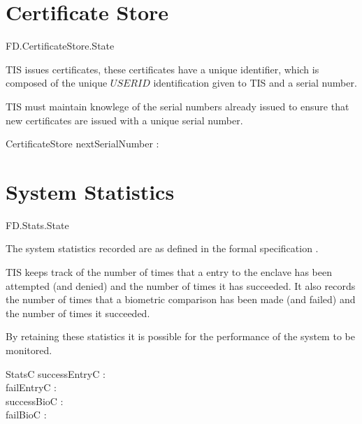 \section{Certificate Store}

\begin{traceunit}{FD.CertificateStore.State}

\end{traceunit}

TIS issues certificates, these certificates have a unique identifier,
which is composed of the unique $USERID$ identification given to TIS
and a serial number.

TIS must maintain knowlege of the serial numbers already issued to
ensure that new certificates are issued with a unique serial number.

\begin{schema}{CertificateStore}
        nextSerialNumber : \nat
\end{schema} 

\section{System Statistics}

\begin{traceunit}{FD.Stats.State}
\end{traceunit}

The system statistics recorded are as defined in the formal
specification \cite{FS}.

TIS keeps track of the number of times that a entry to the
enclave has been attempted (and denied) and the number of times it has succeeded. It
also records the number of times that a biometric comparison has been
made (and failed) and the number of times it succeeded.

By retaining these statistics it is possible for the performance of
the system to be monitored.

\begin{schema}{StatsC} 
        successEntryC : \nat
\\      failEntryC : \nat
\\      successBioC : \nat
\\      failBioC : \nat
\end{schema}

